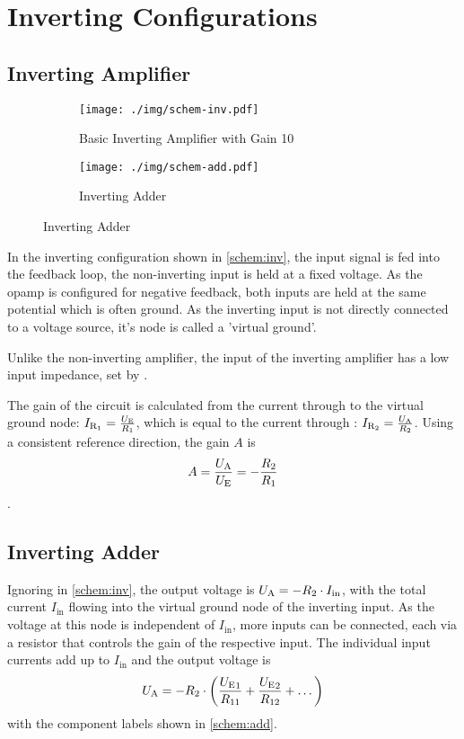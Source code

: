 \chapter{Inverting Configurations}
\section{Inverting Amplifier}

\begin{figure}
	\centering
	\begin{subfigure}{0.4\textwidth}
		\centering
		\texttt{[image: ./img/schem-inv.pdf]}
		\caption{Basic Inverting Amplifier with Gain 10}
		\label{schem:inv}
	\end{subfigure}
	\begin{subfigure}{0.4\textwidth}
		\centering
		\texttt{[image: ./img/schem-add.pdf]}
		\caption{Inverting Adder}
		\label{schem:add}
	\end{subfigure}
\end{figure}

In the inverting configuration shown in \autoref{schem:inv}, the input signal is fed into the feedback loop, the non-inverting input is held at a fixed voltage.
As the opamp is configured for negative feedback, both inputs are held at the same potential which is often ground.
As the inverting input is not directly connected to a voltage source, it's node is called a 'virtual ground'.

Unlike the non-inverting amplifier, the input of the inverting amplifier has a low input impedance, set by .

The gain of the circuit is calculated from the current through  to the virtual ground node: $I_{\mathrm{R_1}} = \frac{U_\text{E}}{R_1}$, which is equal to the current through : $I_{\mathrm{R_2}} = \frac{U_\text{A}}{R_2}$.
Using a consistent reference direction, the gain  $A$ is \[A = \frac{U_\text{A}}{U_\text{E}} = -\frac{R_2}{R_1}\].

\section{Inverting Adder}

Ignoring  in \autoref{schem:inv}, the output voltage \ua is $U_\text{A} = -R_2 \cdot I_\text{in}$, with the total current $I_\text{in}$ flowing into the virtual ground node of the inverting input.
As the voltage at this node is independent of $I_\text{in}$, more inputs can be connected, each via a resistor that controls the gain of the respective input.
The individual input currents add up to $I_\text{in}$ and the output voltage is \[U_\text{A} = -R_2 \cdot \left(\frac{{U_\text{E}}_1}{R_{11}} + \frac{{U_\text{E}}_2}{R_{12}} + \dots\right)\] with the component labels shown in \autoref{schem:add}.
